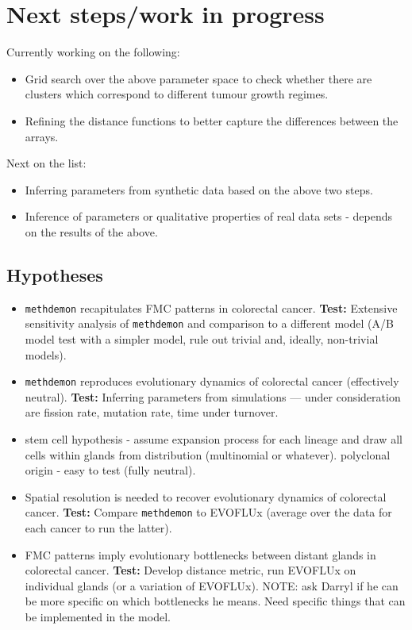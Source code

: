 \section{Next steps/work in progress}
Currently working on the following:
\begin{itemize}
    \item Grid search over the above parameter space to check whether there are clusters which correspond to different tumour growth regimes.
    \item Refining the distance functions to better capture the differences between the arrays.
\end{itemize}
Next on the list:
\begin{itemize}
    \item Inferring parameters from synthetic data based on the above two steps.
    \item Inference of parameters or qualitative properties of real data sets - depends on the results of the above.
\end{itemize}

\subsection{Hypotheses}
\begin{itemize}
    \item \texttt{methdemon} recapitulates FMC patterns in colorectal cancer. \textbf{Test:} Extensive sensitivity analysis of \texttt{methdemon} and comparison to a different model (A/B model test with a simpler model, rule out trivial and, ideally, non-trivial models).
    \item \texttt{methdemon} reproduces evolutionary dynamics of colorectal cancer (effectively neutral). \textbf{Test:} Inferring parameters from simulations --- under consideration are fission rate, mutation rate, time under turnover.
    \item stem cell hypothesis - assume expansion process for each lineage and draw all cells within glands from distribution (multinomial or whatever). polyclonal origin - easy to test (fully neutral).
    \item Spatial resolution is needed to recover evolutionary dynamics of colorectal cancer. \textbf{Test:} Compare \texttt{methdemon} to EVOFLUx (average over the data for each cancer to run the latter).
    \item FMC patterns imply evolutionary bottlenecks between distant glands in colorectal cancer. \textbf{Test:} Develop distance metric, run EVOFLUx on individual glands (or a variation of EVOFLUx). NOTE: ask Darryl if he can be more specific on which bottlenecks he means. Need specific things that can be implemented in the model.
\end{itemize}

